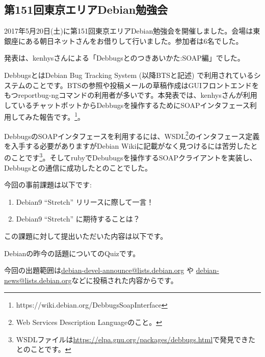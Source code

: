 \documentclass[mingoth,a4paper]{jsarticle}
\begin{document}

\subsection{第151回東京エリアDebian勉強会}

2017年5月20日(土)に第151回東京エリアDebian勉強会を開催しました。会場は東銀座にある朝日ネットさんをお借りして行いました。参加者は6名でした。

発表は、kenhysさんによる「Debbugsとのつきあいかた:SOAP編」でした。

DebbugsとはDebian Bug Tracking System (以降BTSと記述) で利用されているシステムのことです。BTSの参照や投稿メールの草稿作成はGUIフロントエンドをもつreportbug-ngコマンドの利用者が多いです。本発表では、kenhysさんが利用しているチャットボットからDebbugsを操作するためにSOAPインタフェース利用してみた報告です。\footnote{https://wiki.debian.org/DebbugsSoapInterface}。

DebbugsのSOAPインタフェースを利用するには、WSDL\footnote{Web Services Description Languageのこと。}のインタフェース定義を入手する必要がありますがDebian Wikiに記載がなく見つけるには苦労したとのことです\footnote{WSDLファイルは\url{https://elpa.gnu.org/packages/debbugs.html}で発見できたとのことです。}。そしてrubyでDebubugsを操作するSOAPクライアントを実装し、Debbugsとの通信に成功したとのことでした。



今回の事前課題は以下です:
\begin{enumerate}
\item Debian9 ``Stretch'' リリースに際して一言！
\item Debian9 ``Stretch'' に期待することは？
\end{enumerate}
この課題に対して提出いただいた内容は以下です。
\begin{multicols}{2}
{\small

}
\end{multicols}


Debianの昨今の話題についてのQuizです。

今回の出題範囲は\url{debian-devel-announce@lists.debian.org} や \url{debian-news@lists.debian.org}などに投稿された内容からです。

\begin{multicols}{2}

\end{multicols}
\end{document}
